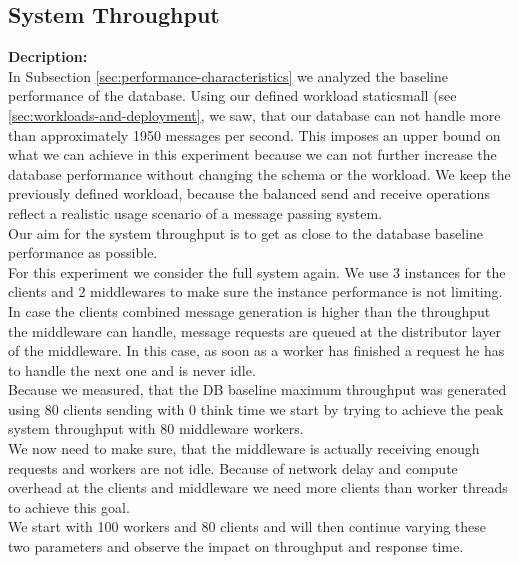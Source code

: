 \documentclass[11pt]{article}
\begin{document}
\subsection{System Throughput}\label{sec:system-throughput}
\textbf{Decription:}\\
In Subsection \ref{sec:performance-characteristics} we analyzed the baseline performance of the database. Using our defined workload staticsmall (see \ref{sec:workloads-and-deployment}, we saw, that our database can not handle more than approximately 1950 messages per second. This imposes an upper bound on what we can achieve in this experiment because we can not further increase the database performance without changing the schema or the workload. We keep the previously defined workload, because the balanced send and receive operations reflect a realistic usage scenario of a message passing system.\\
Our aim for the system throughput is to get as close to the database baseline performance as possible.\\
For this experiment we consider the full system again. We use 3 instances for the clients and 2 middlewares to make sure the instance performance is not limiting.\\
In case the clients combined message generation is higher than the throughput the middleware can handle, message requests are queued at the distributor layer of the middleware. In this case, as soon as a worker has finished a request he has to handle the next one and is never idle. \\
Because we measured, that the DB baseline maximum throughput was generated using 80 clients sending with 0 think time we start by trying to achieve the peak system throughput with 80 middleware workers.\\
We now need to make sure, that the middleware is actually receiving enough requests and workers are not idle. Because of network delay and compute overhead at the clients and middleware we need more clients than worker threads to achieve this goal.\\
We start with 100 workers and 80 clients and will then continue varying these two parameters and observe the impact on throughput and response time.\\
\end{document}
